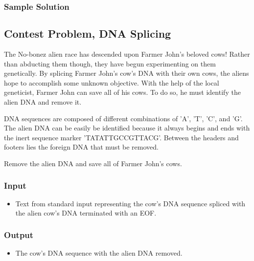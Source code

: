 \subsubsection{Sample Solution}


\subsection{Contest Problem, DNA Splicing}
The No-bonez alien race has descended upon Farmer John's beloved cows!
Rather than abducting them though, they have begun experimenting on them genetically.
By splicing Farmer John's cow's DNA with their own cows, the aliens hope to accomplish some unknown objective.
With the help of the local geneticist, Farmer John can save all of his cows.
To do so, he must identify the alien DNA and remove it.

DNA sequences are composed of different combinations of 'A', 'T', 'C', and 'G'.
The alien DNA can be easily be identified because it always begins and ends with the inert sequence marker 'TATATTGCCGTTACG'.
Between the headers and footers lies the foreign DNA that must be removed.

Remove the alien DNA and save all of Farmer John's cows.

\subsubsection{Input}
\begin{itemize}
\item Text from standard input representing the cow's DNA sequence spliced with the alien cow's DNA terminated with an EOF.
\end{itemize}


\subsubsection{Output}
\begin{itemize}
\item The cow's DNA sequence with the alien DNA removed.
\end{itemize}


